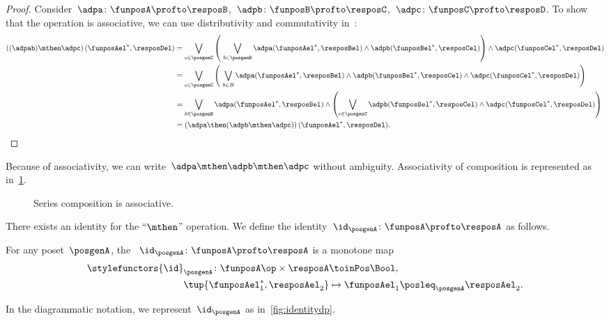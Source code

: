 \begin{proof}
    Consider~$\adpa\colon \funposA\profto \resposB$,~$\adpb\colon \funposB \profto \resposC$,~$\adpc\colon \funposC\profto \resposD$.
    To show that the operation is associative, we can use distributivity and commutativity in~\Bool:
%
    \begin{equation}
        \label{eq:dp_associativity}
        \begin{aligned}
            \left((\adpab) \mthen \adpc\right) (\funposAel^*,\resposDel)
            &= \bigvee_{c \in \posgenC} \left (\ \bigvee_{b\in \posgenB} \adpa(\funposAel^*,\resposBel) \wedge \adpb(\funposBel^*,\resposCel) \right )  \wedge  \adpc (\funposCel^*, \resposDel) \\
            &= \bigvee_{c \in \posgenC} \left (\ \bigvee_{b\in B } \adpa(\funposAel^*,\resposBel)
            \wedge \adpb(\funposBel^*,\resposCel) \wedge \adpc (\funposCel^*, \resposDel)
            \right ) \\
            &= \bigvee_{b \in \posgenB } \adpa(\funposAel^*,\resposBel) \wedge \left ( \bigvee_{c\in \posgenC} \adpb(\funposBel^*,\resposCel) \wedge \adpc (\funposCel^*, \resposDel) \right ) \\
            &= \left(\adpa \then (\adpb \mthen \adpc )\right) (\funposAel^*, \resposDel).
        \end{aligned}
    \end{equation}
%
\end{proof}

Because of associativity, we can write~$\adpa\mthen \adpb\mthen \adpc$ without ambiguity.
Associativity of composition is represented as in~\cref{fig:compositionassociativity}.

\begin{figure}[h!]
    \begin{center}
    \end{center}
    \caption{Series composition is associative. \label{fig:compositionassociativity}}
\end{figure}

There exists an identity for the ``$\mthen$'' operation.
We define the identity~$\id_\posgenA \colon \funposA \profto \resposA$ as follows.

\begin{definition}
    \label{def:dp-identity}
    For any poset~$\posgenA$, the \emph{}~$\id_\posgenA \colon \funposA \profto \resposA$ is a monotone map
    \begin{equation}
        \begin{aligned}
            \stylefunctors{\id}_\posgenA \colon \funposA\op \times \resposA & \toinPos   \Bool, \label{eq:identity}\\
            \tup{\funposAel_1^*, \resposAel_2} & \mapsto \funposAel_1 \posleq_{\posgenA} \resposAel_2.
        \end{aligned}
    \end{equation}
\end{definition}
In the diagrammatic notation, we represent~$\id_\posgenA$ as in~\cref{fig:identitydp}.


